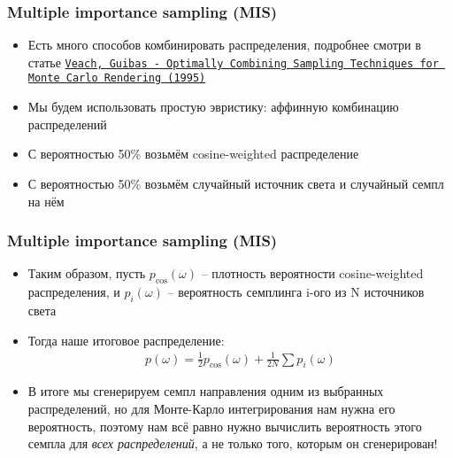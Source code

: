 \documentclass[handout,10pt]{beamer}
\begin{document}
\begin{frame}
\frametitle{Multiple importance sampling (MIS)}
\begin{itemize}
\item Есть много способов комбинировать распределения, подробнее смотри в статье \href{https://cseweb.ucsd.edu/~viscomp/classes/cse168/sp21/readings/veach.pdf}{\texttt{Veach, Guibas - Optimally Combining Sampling Techniques for Monte Carlo Rendering (1995)}}
\pause
\item Мы будем использовать простую эвристику: аффинную комбинацию распределений
\pause
\item С вероятностью 50\% возьмём cosine-weighted распределение
\pause
\item С вероятностью 50\% возьмём случайный источник света и случайный семпл на нём
\end{itemize}
\end{frame}

\begin{frame}
\frametitle{Multiple importance sampling (MIS)}
\begin{itemize}
\item Таким образом, пусть \begin{math}p_{\cos}(\omega)\end{math} -- плотность вероятности cosine-weighted распределения, и \begin{math}p_i(\omega)\end{math} -- вероятность семплинга i-ого из N источников света
\pause
\item Тогда наше итоговое распределение:
\begin{gather*}
p(\omega) = \frac{1}{2}p_{\cos}(\omega) + \frac{1}{2N}\sum p_i(\omega)
\end{gather*}
\pause
\item В итоге мы сгенерируем семпл направления одним из выбранных распределений, но для Монте-Карло интегрирования нам нужна его вероятность, поэтому нам всё равно нужно вычислить вероятность этого семпла для \textit{всех распределений}, а не только того, которым он сгенерирован!
\end{itemize}
\end{frame}
\end{document}
